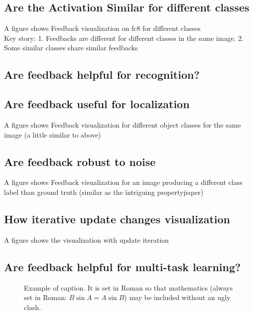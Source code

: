 \documentclass[10pt,twocolumn,letterpaper]{article}
\begin{document}
\subsection{Are the Activation Similar for different classes}
A figure shows Feedback visualization on fc8 for different classes \\

Key story: 1. Feedbacks are different for different classes in the same image. 2. Some similar classes share similar feedbacks

\subsection{Are feedback helpful for recognition?}

\subsection{Are feedback useful for localization}
A figure shows Feedback visualization for different object classes for the same image (a little similar to above)

\subsection{Are feedback robust to noise}
A figure shows Feedback visualization for an image producing a different class label than ground truth (similar as the \"intriguing property\" paper)

\subsection{How iterative update changes visualization}
A figure shows the visualization with update iteration

\subsection{Are feedback helpful for multi-task learning?}


\begin{figure}[t]
\begin{center}
\fbox{\rule{0pt}{2in} \rule{0.9\linewidth}{0pt}}
\end{center}
   \caption{Example of caption.  It is set in Roman so that mathematics
   (always set in Roman: $B \sin A = A \sin B$) may be included without an
   ugly clash.}
\label{fig:long}
\label{fig:onecol}
\end{figure}
\end{document}
